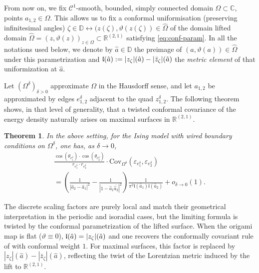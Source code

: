 \documentclass[reqno]{amsart}
\numberwithin{equation}{section}
\newtheorem{theo}{Theorem}[section]
\theoremstyle{definition}
\theoremstyle{remark}
\begin{document}
\medskip
From now on, we fix $\mathcal{C}^1$-smooth, bounded, simply connected domain $\Omega \subset \mathbb{C}$, points $a_{1,2} \in \Omega$. This allows us to fix a conformal uniformisation (preserving infinitesimal angles) $\zeta \in \mathbb{D} \leftrightarrow ( z(\zeta),\vartheta(z(\zeta)) \in \widehat{\Omega}$ of the domain lifted domain $\widehat{\Omega}=(z,\vartheta(z))_{z\in \Omega} \subset \mathbb{R}^{(2,1)}$ satisfying \eqref{eq:conf-param}. In all the notations used below, we denote by $\hat{a} \in \mathbb{D}$ the preimage of $(a,\vartheta (a))\in \widehat{\Omega}$ under this parametrization and   $\frak{l}(\hat{a}):= |z_\zeta|(\hat{a}) - |\bar{z}_{\zeta}|(\hat{a})$ the \emph{metric element} of that uniformization at $\hat{a}$. 


 Let $(\Omega^\delta)_{\delta>0}$ approximate $\Omega$ in the Hausdorff sense, and let $a_{1,2}$ be approximated by edges $e_{1,2}^\delta$ adjacent to the quad $z_{1,2}^\delta$. The following theorem shows, in that level of generality, that a twisted conformal covariance of the energy density naturally arises on maximal surfaces in $\mathbb{R}^{(2,1)}$.
\begin{theo}\label{thm:converger-energy-maximal-surface}
In the above setting, for the Ising model with wired boundary conditions on $\Omega^\delta$, one has, as $\delta \to 0$,
\begin{multline}\label{eq:conformal-rule-energy-maximal}
\frac{\cos(\theta_{e_1^\delta}) \cdot\cos(\theta_{e_2^\delta})}{r_{e_1^\delta} \cdot r_{e_2^\delta}}\cdot \mathrm{Cov}_{\Omega^\delta}(\varepsilon_{e_1^\delta},\varepsilon_{e_2^\delta})
\\
 =
 \left(
 \frac{1}{|\hat{a}_2 - \hat{a}_1|^2}
 -
 \frac{1}{|1 - \hat{a}_1 \overline{\hat{a}_2} |^2}
 \right)
 \frac{1}{\pi^2 \mathfrak{l}(\hat{a}_1)\mathfrak{l}(\hat{a}_2)}
 + o_{\delta \to 0}(1).
\end{multline}
\end{theo} 

The discrete scaling factors are purely local and match their geometrical interpretation in the periodic and isoradial cases, but the limiting formula is twisted by the conformal parametrization of the lifted surface. When the origami map is flat ($\vartheta \equiv 0$), $\frak{l}(\hat a)=|z_\zeta|(\hat a)$ and one recovers the conformally covariant rule of \cite{HonPHD} with conformal weight $1$. For maximal surfaces, this factor is replaced by $|z_\zeta|(\hat a)-|\bar z_\zeta|(\hat a)$, reflecting the twist of the Lorentzian metric induced by the lift to $\mathbb R^{(2,1)}$.
\end{document}
